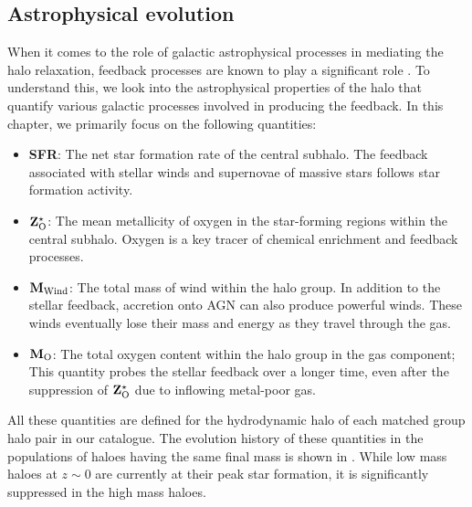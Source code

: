 \subsection{Astrophysical evolution}
\label{sec:hal-gal-props}
When it comes to the role of galactic astrophysical processes in mediating the halo relaxation, feedback processes are known to play a significant role \cite{2011MNRAS.414..195T,2023Velmani&Paranjape}. To understand this, we look into the astrophysical properties of the halo that quantify various galactic processes involved in producing the feedback. In this chapter, we primarily focus on the  following quantities: 
\begin{itemize}
    \item \textbf{SFR}: The net star formation rate of the central subhalo. The feedback associated with stellar winds and supernovae of massive stars follows star formation activity.
    \item $\mathbf{Z^{\star}_{\rm{O}}}$: The mean metallicity of oxygen in the star-forming regions within the central subhalo. Oxygen is a key tracer of chemical enrichment and feedback processes.
    \item $\mathbf{M_{\rm{Wind}}}$: The total mass of wind within the halo group. In addition to the stellar feedback, accretion onto AGN can also produce powerful winds. These winds eventually lose their mass and energy as they travel through the gas.
    \item $\mathbf{M_{\rm{O}}}$: The total oxygen content within the halo group in the gas component; This quantity probes the stellar feedback over a longer time, even after the suppression of $\mathbf{Z^{\star}_{\rm{O}}}$ due to inflowing metal-poor gas.
\end{itemize}
All these quantities are defined for the hydrodynamic halo of each matched group halo pair in our catalogue. The evolution history of these quantities in the populations of haloes having the same final mass is shown in . While low mass haloes at $z \sim 0$ are currently at their peak star formation, it is significantly suppressed in the high mass haloes.

